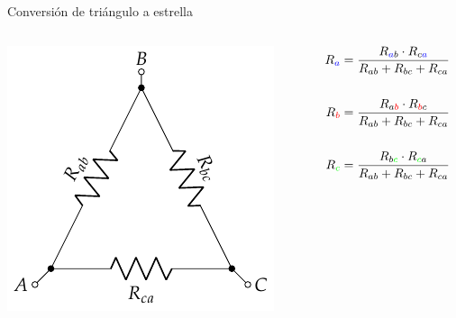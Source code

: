\documentclass[aspectratio=169, xcolor={usenames,svgnames,dvipsnames}]{beamer}
\begin{document}
\begin{frame}{Conversión de triángulo a estrella}
    \begin{columns}
    \begin{column}{0.3\columnwidth}
    \begin{center}
    \includegraphics[width=.9\linewidth]{../figs/Conexion_Triangulo.pdf}
    \end{center}
    \end{column}
    \begin{column}{0.4\columnwidth}
    \begin{align*}
        R_{\color{blue}a} &= \frac{R_{{\color{blue}a}b} \cdot R_{c{\color{blue}a}}}{R_{ab} + R_{bc} + R_{ca}}\\
        \\    
        R_{\color{red}b} &= \frac{R_{a{\color{red}b}} \cdot R_{{\color{red}b}c}}{R_{ab} + R_{bc} + R_{ca}}\\
        \\
        R_{\color{green}c} &=  \frac{R_{b{\color{green}c}} \cdot R_{{\color{green}c}a}}{R_{ab} + R_{bc} + R_{ca}}
    \end{align*}
    \end{column}
    

\end{columns}
\end{frame}
\end{document}
